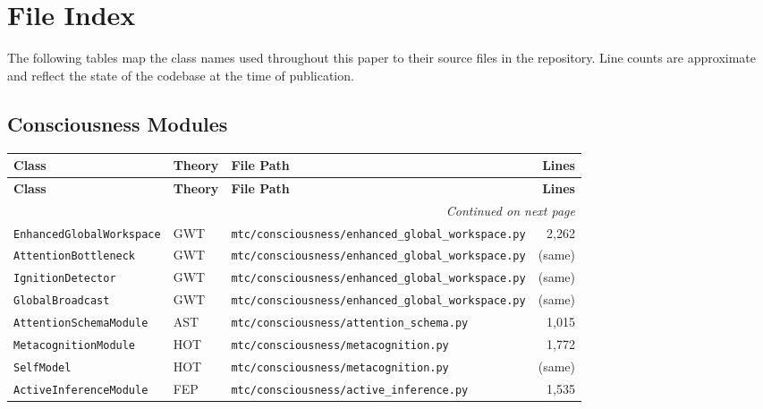 \section{File Index}\label{app:files}

The following tables map the class names used throughout this paper to their source files in the repository.
Line counts are approximate and reflect the state of the codebase at the time of publication.

\subsection{Consciousness Modules}

\begin{longtable}{@{}llp{5.2cm}r@{}}
\toprule
\textbf{Class} & \textbf{Theory} & \textbf{File Path} & \textbf{Lines} \\
\midrule
\endfirsthead
\toprule
\textbf{Class} & \textbf{Theory} & \textbf{File Path} & \textbf{Lines} \\
\midrule
\endhead
\midrule
\multicolumn{4}{r}{\emph{Continued on next page}} \\
\bottomrule
\endfoot
\bottomrule
\endlastfoot
\texttt{EnhancedGlobalWorkspace}       & GWT    & \small\texttt{mtc/consciousness/enhanced\_global\_workspace.py}        & 2{,}262 \\
\texttt{AttentionBottleneck}           & GWT    & \small\texttt{mtc/consciousness/enhanced\_global\_workspace.py}        & (same) \\
\texttt{IgnitionDetector}              & GWT    & \small\texttt{mtc/consciousness/enhanced\_global\_workspace.py}        & (same) \\
\texttt{GlobalBroadcast}               & GWT    & \small\texttt{mtc/consciousness/enhanced\_global\_workspace.py}        & (same) \\
\texttt{AttentionSchemaModule}         & AST    & \small\texttt{mtc/consciousness/attention\_schema.py}                  & 1{,}015 \\
\texttt{MetacognitionModule}           & HOT    & \small\texttt{mtc/consciousness/metacognition.py}                      & 1{,}772 \\
\texttt{SelfModel}                     & HOT    & \small\texttt{mtc/consciousness/metacognition.py}                      & (same) \\
\texttt{ActiveInferenceModule}         & FEP    & \small\texttt{mtc/consciousness/active\_inference.py}                  & 1{,}535 \\

\end{longtable}
